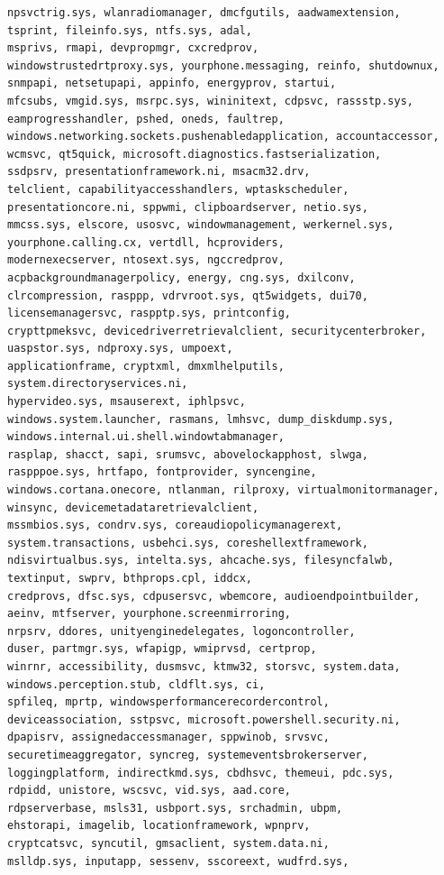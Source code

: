 \documentclass[a4paper,twoside,12pt]{book}
\begin{document}
\begin{appendices}
\begin{lstlisting}[label={lst:dlls},caption={All gathered DLL's},escapeinside=``,basicstyle=\tiny,breaklines=true]
npsvctrig.sys, wlanradiomanager, dmcfgutils, aadwamextension, 
tsprint, fileinfo.sys, ntfs.sys, adal, 
msprivs, rmapi, devpropmgr, cxcredprov, 
windowstrustedrtproxy.sys, yourphone.messaging, reinfo, shutdownux, 
snmpapi, netsetupapi, appinfo, energyprov, startui, 
mfcsubs, vmgid.sys, msrpc.sys, wininitext, cdpsvc, rassstp.sys, 
eamprogresshandler, pshed, oneds, faultrep, 
windows.networking.sockets.pushenabledapplication, accountaccessor, 
wcmsvc, qt5quick, microsoft.diagnostics.fastserialization, 
ssdpsrv, presentationframework.ni, msacm32.drv, 
telclient, capabilityaccesshandlers, wptaskscheduler, 
presentationcore.ni, sppwmi, clipboardserver, netio.sys, 
mmcss.sys, elscore, usosvc, windowmanagement, werkernel.sys, 
yourphone.calling.cx, vertdll, hcproviders, 
modernexecserver, ntosext.sys, ngccredprov, 
acpbackgroundmanagerpolicy, energy, cng.sys, dxilconv, 
clrcompression, rasppp, vdrvroot.sys, qt5widgets, dui70, 
licensemanagersvc, raspptp.sys, printconfig, 
crypttpmeksvc, devicedriverretrievalclient, securitycenterbroker, 
uaspstor.sys, ndproxy.sys, umpoext, 
applicationframe, cryptxml, dmxmlhelputils, system.directoryservices.ni, 
hypervideo.sys, msauserext, iphlpsvc, 
windows.system.launcher, rasmans, lmhsvc, dump_diskdump.sys, 
windows.internal.ui.shell.windowtabmanager, 
rasplap, shacct, sapi, srumsvc, abovelockapphost, slwga, 
raspppoe.sys, hrtfapo, fontprovider, syncengine, 
windows.cortana.onecore, ntlanman, rilproxy, virtualmonitormanager, 
winsync, devicemetadataretrievalclient, 
mssmbios.sys, condrv.sys, coreaudiopolicymanagerext, 
system.transactions, usbehci.sys, coreshellextframework, 
ndisvirtualbus.sys, intelta.sys, ahcache.sys, filesyncfalwb, 
textinput, swprv, bthprops.cpl, iddcx, 
credprovs, dfsc.sys, cdpusersvc, wbemcore, audioendpointbuilder, 
aeinv, mtfserver, yourphone.screenmirroring, 
nrpsrv, ddores, unityenginedelegates, logoncontroller, 
duser, partmgr.sys, wfapigp, wmiprvsd, certprop, 
winrnr, accessibility, dusmsvc, ktmw32, storsvc, system.data, 
windows.perception.stub, cldflt.sys, ci, 
spfileq, mprtp, windowsperformancerecordercontrol, 
deviceassociation, sstpsvc, microsoft.powershell.security.ni, 
dpapisrv, assignedaccessmanager, sppwinob, srvsvc, 
securetimeaggregator, syncreg, systemeventsbrokerserver, 
loggingplatform, indirectkmd.sys, cbdhsvc, themeui, pdc.sys, 
rdpidd, unistore, wscsvc, vid.sys, aad.core, 
rdpserverbase, msls31, usbport.sys, srchadmin, ubpm, 
ehstorapi, imagelib, locationframework, wpnprv, 
cryptcatsvc, syncutil, gmsaclient, system.data.ni, 
mslldp.sys, inputapp, sessenv, sscoreext, wudfrd.sys, 

\end{lstlisting}
\end{appendices}
\end{document}
